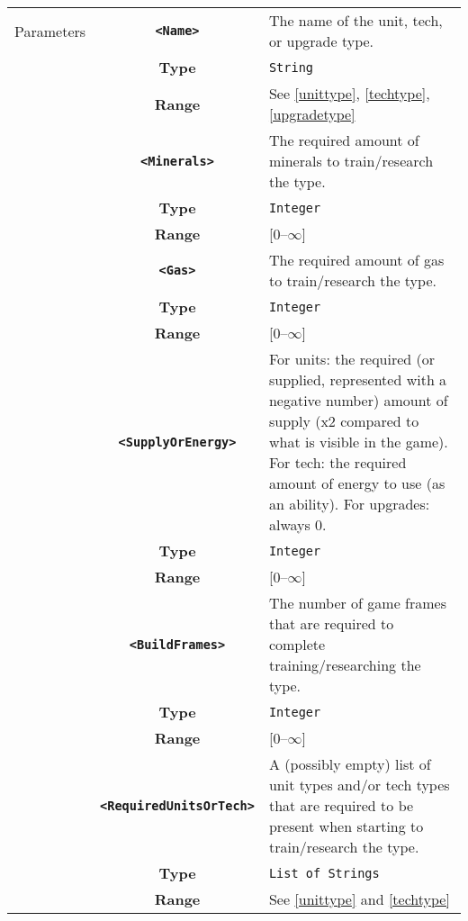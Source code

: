  \begin{tabularx}{\textwidth}{l | c | p{8cm}|}
 \cline{2-3}
 Parameters & \textbf{\verb|<Name>|} & The name of the unit, tech, or upgrade type. \\
            & \textbf{Type} & \verb|String| \\
            & \textbf{Range} & See \ref{unittype}, \ref{techtype}, \ref{upgradetype} \\
            \cline{2-3}
            & \textbf{\verb|<Minerals>|} & The required amount of minerals to train/research the type. \\
            & \textbf{Type} & \verb|Integer| \\
            & \textbf{Range} & [0--$\infty$] \\
            \cline{2-3}
            & \textbf{\verb|<Gas>|} & The required amount of gas to train/research the type. \\
            & \textbf{Type} & \verb|Integer| \\
            & \textbf{Range} & [0--$\infty$] \\
            \cline{2-3}
            & \textbf{\verb|<SupplyOrEnergy>|} & For units: the required (or supplied, represented with a negative number) amount of supply (x2 compared to what is visible in the game). For tech: the required amount of energy to use (as an ability). For upgrades: always 0. \\
            & \textbf{Type} & \verb|Integer| \\
            & \textbf{Range} & [0--$\infty$] \\
            \cline{2-3}
            & \textbf{\verb|<BuildFrames>|} & The number of game frames that are required to complete training/researching the type.\\
            & \textbf{Type} & \verb|Integer| \\
            & \textbf{Range} & [0--$\infty$] \\
            \cline{2-3}
            & \textbf{\verb|<RequiredUnitsOrTech>|} & A (possibly empty) list of unit types and/or tech types that are required to be present when starting to train/research the type. \\
            & \textbf{Type} & \verb|List of Strings| \\
            & \textbf{Range} & See \ref{unittype} and \ref{techtype} \\
            \cline{2-3}
\end{tabularx}

